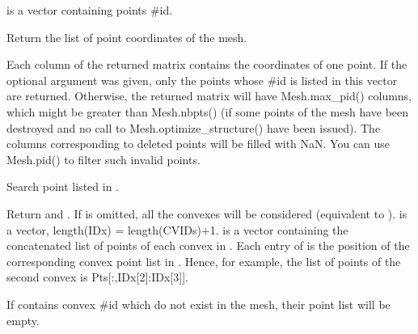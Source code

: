 \documentclass[a4paper,11pt,english]{sphinxmanual}
\begin{document}
\begin{fulllineitems}
\begin{fulllineitems}
 is a vector containing points \#id.

\end{fulllineitems}


\begin{fulllineitems}
\label{\detokenize{python/cmdref_Mesh:getfem.Mesh.pts}}
Return the list of point coordinates of the mesh.

Each column of the returned matrix contains the coordinates of one
point. If the optional argument  was given, only the points
whose \#id is listed in this vector are returned. Otherwise, the
returned matrix will have Mesh.max\_pid() columns, which might
be greater than Mesh.nbpts() (if some points of the mesh have
been destroyed and no call to Mesh.optimize\_structure() have
been issued). The columns corresponding to deleted points will be
filled with NaN. You can use Mesh.pid() to filter such invalid
points.

\end{fulllineitems}


\begin{fulllineitems}
\label{\detokenize{python/cmdref_Mesh:getfem.Mesh.pts_from_cvid}}
Search point listed in .

Return  and .
If  is omitted, all the convexes will be considered
(equivalent to ).  is a
vector, length(IDx) = length(CVIDs)+1.  is a
vector containing the concatenated list of points
of each convex in . Each entry of  is the position
of the corresponding convex point list in . Hence, for
example, the list of points of the second convex is
Pts{[}:,IDx{[}2{]}:IDx{[}3{]}{]}.

If  contains convex \#id which do not exist in the mesh,
their point list will be empty.


\end{fulllineitems}
\end{fulllineitems}
\end{document}
